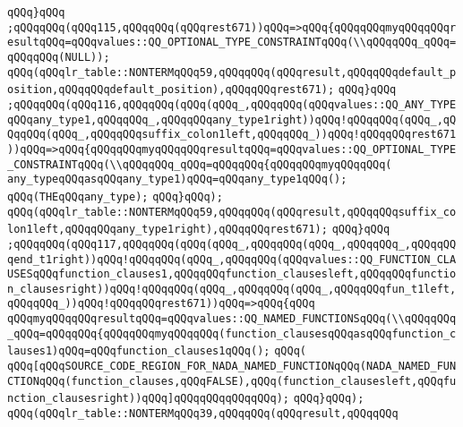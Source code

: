 \verb|qQQq}qQQq|\newline
\verb|;qQQqqQQq(qQQq115,qQQqqQQq(qQQqrest671))qQQq=>qQQq{qQQqqQQqmyqQQqqQQqresultqQQq=qQQqvalues::QQ_OPTIONAL_TYPE_CONSTRAINTqQQq(\\qQQqqQQq_qQQq=qQQqqQQq(NULL));|\newline
\verb|qQQq(qQQqlr_table::NONTERMqQQq59,qQQqqQQq(qQQqresult,qQQqqQQqdefault_position,qQQqqQQqdefault_position),qQQqqQQqrest671);|\newline
\verb|qQQq}qQQq|\newline
\verb|;qQQqqQQq(qQQq116,qQQqqQQq(qQQq(qQQq_,qQQqqQQq(qQQqvalues::QQ_ANY_TYPEqQQqany_type1,qQQqqQQq_,qQQqqQQqany_type1right))qQQq!qQQqqQQq(qQQq_,qQQqqQQq(qQQq_,qQQqqQQqsuffix_colon1left,qQQqqQQq_))qQQq!qQQqqQQqrest671))qQQq=>qQQq{qQQqqQQqmyqQQqqQQqresultqQQq=qQQqvalues::QQ_OPTIONAL_TYPE_CONSTRAINTqQQq(\\qQQqqQQq_qQQq=qQQqqQQq{qQQqqQQqmyqQQqqQQq(|\newline
\verb|any_typeqQQqasqQQqany_type1)qQQq=qQQqany_type1qQQq();|\newline
\verb|qQQq(THEqQQqany_type);|\newline
\verb|qQQq}qQQq);|\newline
\verb|qQQq(qQQqlr_table::NONTERMqQQq59,qQQqqQQq(qQQqresult,qQQqqQQqsuffix_colon1left,qQQqqQQqany_type1right),qQQqqQQqrest671);|\newline
\verb|qQQq}qQQq|\newline
\verb|;qQQqqQQq(qQQq117,qQQqqQQq(qQQq(qQQq_,qQQqqQQq(qQQq_,qQQqqQQq_,qQQqqQQqend_t1right))qQQq!qQQqqQQq(qQQq_,qQQqqQQq(qQQqvalues::QQ_FUNCTION_CLAUSESqQQqfunction_clauses1,qQQqqQQqfunction_clausesleft,qQQqqQQqfunction_clausesright))qQQq!qQQqqQQq(qQQq_,qQQqqQQq(qQQq_,qQQqqQQqfun_t1left,qQQqqQQq_))qQQq!qQQqqQQqrest671))qQQq=>qQQq{qQQq|\newline
\verb|qQQqmyqQQqqQQqresultqQQq=qQQqvalues::QQ_NAMED_FUNCTIONSqQQq(\\qQQqqQQq_qQQq=qQQqqQQq{qQQqqQQqmyqQQqqQQq(function_clausesqQQqasqQQqfunction_clauses1)qQQq=qQQqfunction_clauses1qQQq();|\newline
\verb|qQQq(|\newline
\verb|qQQq[qQQqSOURCE_CODE_REGION_FOR_NADA_NAMED_FUNCTIONqQQq(NADA_NAMED_FUNCTIONqQQq(function_clauses,qQQqFALSE),qQQq(function_clausesleft,qQQqfunction_clausesright))qQQq]qQQqqQQqqQQqqQQq);|\newline
\verb|qQQq}qQQq);|\newline
\verb|qQQq(qQQqlr_table::NONTERMqQQq39,qQQqqQQq(qQQqresult,qQQqqQQq|\newline
